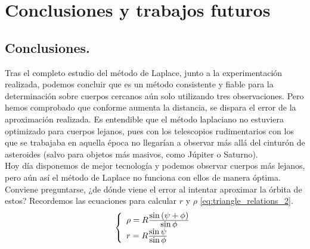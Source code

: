 \chapter{Conclusiones y trabajos futuros}
\section{Conclusiones.}
Tras el completo estudio del método de Laplace, junto a la experimentación realizada, podemos concluir que es un método consistente y fiable para la determinación sobre cuerpos cercanos aún solo utilizando tres observaciones. Pero hemos comprobado que conforme aumenta la distancia, se dispara el error de la aproximación realizada. Es entendible que el método laplaciano no estuviera optimizado para cuerpos lejanos, pues con los telescopios rudimentarios con los que se trabajaba en aquella época no llegarían a observar más allá del cinturón de asteroides (salvo para objetos más masivos, como Júpiter o Saturno).\\

Hoy día disponemos de mejor tecnología y podemos observar cuerpos más lejanos, pero aún así el método de Laplace no funciona con ellos de manera óptima. Conviene preguntarse, ¿de dónde viene el error al intentar aproximar la órbita de estos? Recordemos las ecuaciones para calcular $r$ y $\rho$ \eqref{eq:triangle_relations_2}.
\[
\left\{
\begin{array}{l}
	\rho=R\frac{\displaystyle \sin{(\psi+\phi)}}{\displaystyle \sin{\phi}}\\
	r=R\frac{\displaystyle \sin{\psi}}{\displaystyle \sin{\phi}}
\end{array}
\right.
\]


